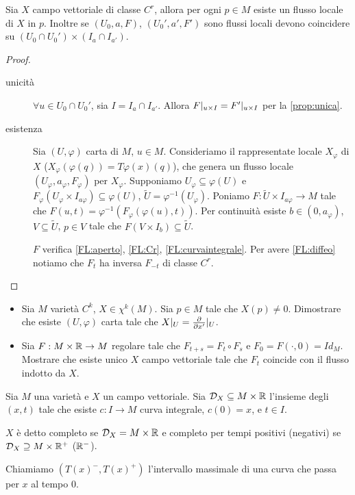 \begin{proposition}
	Sia $X$ campo vettoriale di classe $C^r$, allora per ogni $p\in M$ esiste un flusso locale di $X$ in $p$. Inoltre se $(U_0,a,F)$, $(U_0',a',F')$ sono flussi locali devono coincidere su $(U_0\cap U_0')\times (I_a\cap I_{a'})$.
\end{proposition}
\begin{proof}
	\begin{description}
	\item [unicità]
	$\forall u\in U_0\cap U_0'$, sia $I=I_a\cap I_{a'}$. Allora $F|_{{u}\times I}=F'|_{{u}\times I}$ per la \ref{prop:unica}.
	
	\item [esistenza]
	Sia $(U,\varphi)$ carta di $M$, $u\in M$. Consideriamo il rappresentate locale $X_\varphi$ di $X$ ($X_\varphi(\varphi(q))=T\varphi(x)(q)$), che genera un flusso locale $(U_\varphi,a_\varphi,F_\varphi)$ per $X_\varphi$.
	Supponiamo $U_\varphi\subseteq \varphi(U)$ e $F_\varphi(U_\varphi\times I_{a\varphi})\subseteq \varphi(U)$, $\tilde U=\varphi^{-1}(U_\varphi)$.
	Poniamo  $F:\tilde U\times I_{a\varphi}\to M$ tale che $F(u,t)=\varphi^{-1}(F_\varphi(\varphi(u),t))$.
	Per continuità esiste $b\in(0,a_\varphi)$, $V\subseteq \tilde U$, $p\in V$ tale che $F(V\times I_b)\subseteq \tilde U$.
	
	$F$ verifica \ref{FL:aperto}, \ref{FL:Cr}, \ref{FL:curvaintegrale}. Per avere  \ref{FL:diffeo} notiamo che $F_t$ ha inversa $F_{-t}$ di classe $C^r$.
	\end{description}
\end{proof}

\begin{exercise}
	\begin{itemize}
		\item Sia $M$ varietà $C^k$, $X\in\chi^k(M)$. Sia $p\in M$ tale che $X(p)\not=0$. Dimostrare che esiste $(U,\varphi)$ carta tale che $X|_U=\frac{\partial}{\partial x'}|_U$.
		\item Sia $F:M\times\mathbb R\to M$ regolare tale che $F_{t+s}=F_t\circ F_s$ e $F_0=F(\cdot,0)=Id_M$. Mostrare che esiste unico $X$ campo vettoriale tale che $F_t$ coincide con il flusso indotto da $X$.
	\end{itemize}
\end{exercise}

\begin{definition}
	Sia $M$ una varietà e $X$ un campo vettoriale. Sia $\mathcal D_X\subseteq M\times \mathbb R$ l'insieme degli $(x,t)$ tale che esiste $c:I\to M$ curva integrale, $c(0)=x$, e $t \in I$.
	
	$X$ è detto completo se $\mathcal D_X=M\times \mathbb R$ e completo per tempi positivi (negativi) se $\mathcal D_X\supseteq M\times\mathbb R^+$ ($\mathbb R^-$).
	
	Chiamiamo $(T(x)^-,T(x)^+)$ l'intervallo massimale di una curva che passa per $x$ al tempo 0. 
\end{definition}

